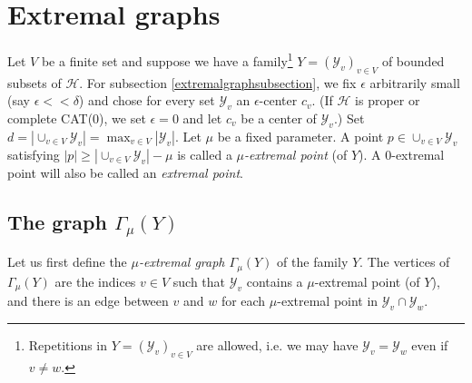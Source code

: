 \documentclass[11pt,letterpaper]{amsart}
\begin{document}
\section{Extremal graphs\label{extremalsection}} 



Let $V$ be a finite set and suppose we have a family\footnote{Repetitions in $Y=(\mathcal Y_v)_{v\in V}$ are allowed, i.e. we may have $\mathcal Y_v=\mathcal Y_w$ even if $v\not=w$.} $Y=(\mathcal Y_v)_{v\in V}$ of bounded subsets of $\mathcal H$. %
For subsection \ref{extremalgraphsubsection}, we fix $\epsilon$ arbitrarily small (say $\epsilon<<\delta$) and chose for every set $\mathcal Y_v$ an $\epsilon$-center $c_v$.
(If $\mathcal H$ is proper or complete CAT(0), we set $\epsilon=0$ and let $c_v$ be a center of $\mathcal Y_v$.) Set $d=|\cup_{v\in V}\mathcal Y_v|=\max_{v\in V}|\mathcal Y_v|$.
Let $\mu$ be a fixed parameter. A point $p\in\cup_{v\in V}\mathcal Y_v$ satisfying $|p|\geq |\cup_{v\in V}\mathcal Y_v|-\mu$ is called a {\it $\mu$-extremal point} (of $Y$). A $0$-extremal point will also be called an {\it extremal point}. 

\subsection{The graph $\Gamma_{\mu}(Y)$\label{extremalgraphsubsection}}
Let us first define the {\it $\mu$-extremal graph $\Gamma_{\mu}(Y)$} of the family $Y$. The vertices of $\Gamma_{\mu}(Y)$ are the indices $v\in V$ such that $\mathcal Y_v$ contains a $\mu$-extremal point (of $Y$), and there is an edge between $v$ and $w$ for each $\mu$-extremal point in $\mathcal Y_v\cap\mathcal Y_w$.


\end{document}
